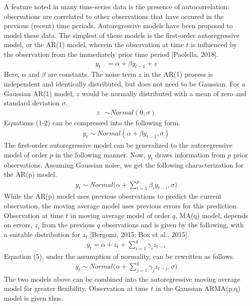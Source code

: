\documentclass[12pt,letterpaper,reqno,fleqn]{article}
\begin{document}
A feature noted in many time-series data is the presence of autocorrelation: observations are correlated to other observations that have occured in the previous (recent) time periods. Autoregressive models have been proposed to model these data. The simplest of these models is the first-order autoregressive model, or the AR(1) model, wherein the observation at time $t$ is influenced by the observation from the immediately prior time period [Paolella, 2018].
\begin{align}
y_t &= \alpha + \beta y_{t-1} + z 
\end{align}
Here, $\alpha$ and $\beta$ are constants. The noise term $z$ in the AR(1) process is independent and identically distributed, but does not need to be Gaussian. For a Gaussian AR(1) model, $z$ would be normally distributed with a mean of zero and standard deviation $\sigma$.
\begin{align}
z &\sim Normal(0, \sigma)
\end{align}
Equations (1-2) can be compressed into the following form.
\begin{align}
y_t \sim Normal(\alpha + \beta y_{t-1}, \sigma)
\end{align}
The first-order autoregressive model can be generalized to the autoregressive model of order $p$ in the following manner. Now, $y_t$ draws information from $p$ prior observations. Assuming Gaussian noise, we get the following characterization for the AR(p) model.
\begin{align}
y_t \sim Normal \big(\alpha + \sum_{i=1}^p \beta_i y_{t-i}, \sigma \big)
\end{align}
\hspace{.5cm} While the AR(p) model uses previous observations to predict the current observation, the moving average model uses previous errors for this prediction. Observation at time $t$ in moving average model of order $q$, MA(q) model, depends on errors, $z_i$ from the previous $q$ observations and is given by the following, with a suitable distribution for $z_t$ [Bergomi, 2015; Box et al., 2015].
\begin{align}
y_t = \alpha + z_t + \sum_{i=1}^q \gamma_i z_{t-i}
\end{align}
Equation (5), under the assumption of normality, can be rewritten as follows.
\begin{align}
y_t \sim Normal \big( \alpha + \sum_{j=1}^q \gamma_j z_{t-j}, \sigma \big)
\end{align}
\hspace{.5cm} The two models above can be combined into the autoregressive moving average model for greater flexibility. Observation at time $t$ in the Gaussian ARMA(p,q) model is given thus.
\end{document}
